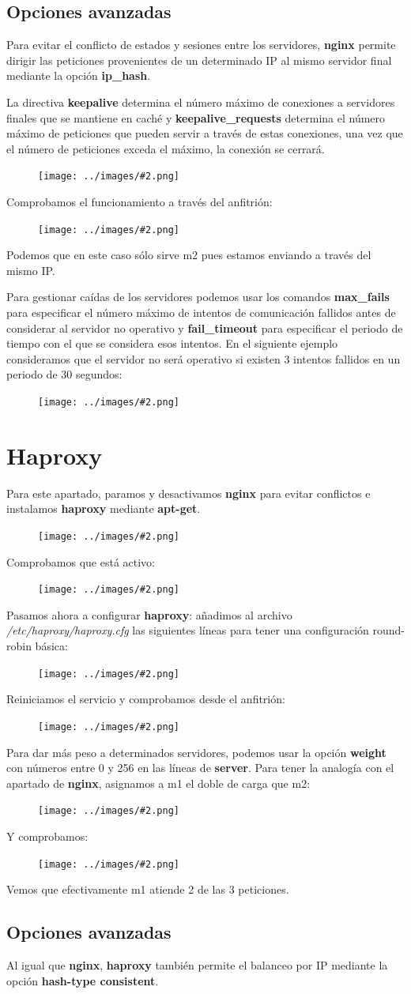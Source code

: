 \documentclass[twoside]{article}
\newcommand{\image}[2]{
\begin{figure}[H]
    \texttt{[image: ../images/\#2.png]}
    \centering
\end{figure}
}
\begin{document}
\subsection{Opciones avanzadas}
Para evitar el conflicto de estados y sesiones entre los servidores, \textbf{nginx} permite dirigir las peticiones provenientes de un determinado IP al mismo servidor final mediante la opción \textbf{ip\_hash}. 

La directiva \textbf{keepalive} determina el número máximo de conexiones a servidores finales que se mantiene en caché y \textbf{keepalive\_requests} determina el número máximo de peticiones que pueden servir a través de estas conexiones, una vez que el número de peticiones exceda el máximo, la conexión se cerrará.
\image{8}{12}
Comprobamos el funcionamiento a través del anfitrión:
\image{8}{13}
Podemos que en este caso sólo sirve m2 pues estamos enviando a través del mismo IP.

Para gestionar caídas de los servidores podemos usar los comandos \textbf{max\_fails} para especificar el número máximo de intentos de comunicación fallidos antes de considerar al servidor no operativo y \textbf{fail\_timeout} para especificar el periodo de tiempo con el que se considera esos intentos. En el siguiente ejemplo consideramos que el servidor no será operativo si existen 3 intentos fallidos en un periodo de 30 segundos:
\image{8}{14}


\section{Haproxy}
Para este apartado, paramos y desactivamos \textbf{nginx} para evitar conflictos e instalamos \textbf{haproxy} mediante \textbf{apt-get}.
\image{8}{15}
Comprobamos que está activo:
\image{8}{16}
Pasamos ahora a configurar \textbf{haproxy}: añadimos al archivo \textit{/etc/haproxy/haproxy.cfg} las siguientes líneas para tener una configuración round-robin básica:
\image{8}{17}
Reiniciamos el servicio y comprobamos desde el anfitrión:
\image{6}{18}
Para dar más peso a determinados servidores, podemos usar la opción \textbf{weight} con números entre 0 y 256 en las líneas de \textbf{server}. Para tener la analogía con el apartado de \textbf{nginx}, asignamos a m1 el doble de carga que m2:
\image{8}{19}
Y comprobamos:
\image{6}{20}
Vemos que efectivamente m1 atiende 2 de las 3 peticiones.
\subsection{Opciones avanzadas}
Al igual que \textbf{nginx}, \textbf{haproxy} también permite el balanceo por IP mediante la opción \textbf{hash-type consistent}.
\end{document}
